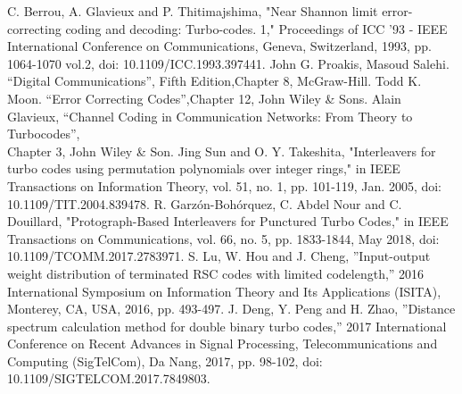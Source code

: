 \begin{thebibliography}{99}
  C. Berrou, A. Glavieux and P. Thitimajshima, "Near Shannon limit error-correcting coding and decoding: Turbo-codes. 1," Proceedings of ICC '93 - IEEE International Conference on Communications, Geneva, Switzerland, 1993, pp. 1064-1070 vol.2, doi: 10.1109/ICC.1993.397441.
 John G. Proakis, Masoud Salehi. ``Digital Communications'', 
Fifth Edition,Chapter 8, McGraw-Hill.
 Todd K. Moon. ``Error Correcting Codes'',Chapter 12, John Wiley \& Sons.
Alain Glavieux, ``Channel Coding in Communication Networks: From Theory to Turbocodes'',\\ Chapter 3, John Wiley \& Son. 
 Jing Sun and O. Y. Takeshita, "Interleavers for turbo codes using permutation polynomials over integer rings," in IEEE Transactions on Information Theory, vol. 51, no. 1, pp. 101-119, Jan. 2005, doi: 10.1109/TIT.2004.839478.
R. Garzón-Bohórquez, C. Abdel Nour and C. Douillard, "Protograph-Based Interleavers for Punctured Turbo Codes," in IEEE Transactions on Communications, vol. 66, no. 5, pp. 1833-1844, May 2018, doi: 10.1109/TCOMM.2017.2783971.
S. Lu, W. Hou and J. Cheng, ”Input-output weight distribution of terminated RSC codes with limited codelength,” 2016
International Symposium on Information Theory and Its Applications (ISITA), Monterey, CA, USA, 2016, pp. 493-497.
J. Deng, Y. Peng and H. Zhao, ”Distance spectrum calculation method for double binary turbo codes,” 2017 International
Conference on Recent Advances in Signal Processing, Telecommunications and Computing (SigTelCom), Da Nang, 2017,
pp. 98-102, doi: 10.1109/SIGTELCOM.2017.7849803.
\end{thebibliography}
